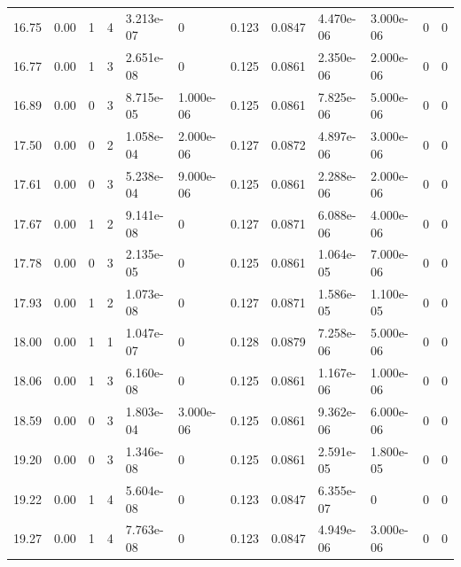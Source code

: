 \documentclass[preview]{standalone}
\begin{document}
{{{\begin{tabular}{L{1.2cm}C{1.2cm} C{0.3cm}C{0.5cm} C{1.4cm}C{1.4cm} C{1.4cm}C{1.4cm} C{1.6cm}C{1.6cm} C{1.6cm}C{1.6cm}}
  16.75  &  0.00  & 1     &  4 &  3.213e-07  & 0  &  0.123&   0.0847& 4.470e-06 & 3.000e-06   &  0 & 0  \\ 
  16.77  &  0.00  & 1     &  3 &  2.651e-08  & 0  &  0.125&   0.0861& 2.350e-06 & 2.000e-06   &  0 & 0  \\ 
  16.89  &  0.00  & 0     &  3 &  8.715e-05  & 1.000e-06  &  0.125&   0.0861& 7.825e-06 & 5.000e-06   &  0 & 0  \\ 
  17.50  &  0.00  & 0     &  2 &  1.058e-04  & 2.000e-06  &  0.127&   0.0872& 4.897e-06 & 3.000e-06   &  0 & 0  \\ 
  17.61  &  0.00  & 0     &  3 &  5.238e-04  & 9.000e-06  &  0.125&   0.0861& 2.288e-06 & 2.000e-06   &  0 & 0  \\ 
  17.67  &  0.00  & 1     &  2 &  9.141e-08  & 0  &  0.127&   0.0871& 6.088e-06 & 4.000e-06   &  0 & 0  \\ 
  17.78  &  0.00  & 0     &  3 &  2.135e-05  & 0  &  0.125&   0.0861& 1.064e-05 & 7.000e-06   &  0 & 0  \\ 
  17.93  &  0.00  & 1     &  2 &  1.073e-08  & 0  &  0.127&   0.0871& 1.586e-05 & 1.100e-05   &  0 & 0  \\ 
  18.00  &  0.00  & 1     &  1 &  1.047e-07  & 0  &  0.128&   0.0879& 7.258e-06 & 5.000e-06   &  0 & 0  \\ 
  18.06  &  0.00  & 1     &  3 &  6.160e-08  & 0  &  0.125&   0.0861& 1.167e-06 & 1.000e-06   &  0 & 0  \\ 
  18.59  &  0.00  & 0     &  3 &  1.803e-04  & 3.000e-06  &  0.125&   0.0861& 9.362e-06 & 6.000e-06   &  0 & 0  \\ 
  19.20  &  0.00  & 0     &  3 &  1.346e-08  & 0  &  0.125&   0.0861& 2.591e-05 & 1.800e-05   &  0 & 0  \\ 
  19.22  &  0.00  & 1     &  4 &  5.604e-08  & 0  &  0.123&   0.0847& 6.355e-07 & 0   &  0 & 0  \\ 
  19.27  &  0.00  & 1     &  4 &  7.763e-08  & 0  &  0.123&   0.0847& 4.949e-06 & 3.000e-06   &  0 & 0  \\ 
\hline 
\end{tabular} 

}}}
\end{document}

